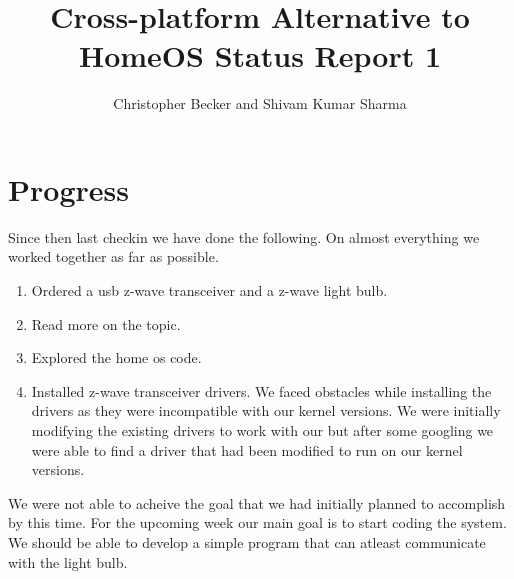 \documentclass[letterpaper,12pt]{article}
\title{Cross-platform Alternative to HomeOS Status Report 1}
\author{Christopher Becker and Shivam Kumar Sharma}
\begin{document}
\maketitle

\section*{Progress}
Since then last checkin we have done the following. On almost everything we worked together as far as possible.
\begin{enumerate}
 \item Ordered a usb z-wave transceiver and a z-wave light bulb.
 \item Read more on the topic.
 \item Explored the home os code.
 \item Installed z-wave transceiver drivers. We faced obstacles while installing the drivers as they were incompatible with our kernel versions. We were initially modifying the existing drivers to work with our but after some googling we were able to find a driver that had been modified to run on our kernel versions.
\end{enumerate}
We were not able to acheive the goal that we had initially planned to accomplish by this time.
For the upcoming week our main goal is to start coding the system. We should be able to develop a simple program that can atleast communicate with the light bulb.
\end{document}
